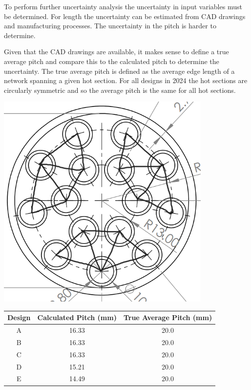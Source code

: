 \documentclass{article}
\begin{document}
To perform further uncertainty analysis the uncertainty in input variables must be determined.
For length the uncertainty can be estimated from CAD drawings and manufacturing processes.
The uncertainty in the pitch is harder to determine.

Given that the CAD drawings are available, it makes sense to define a true average pitch and compare this to the calculated pitch to determine the uncertainty.
The true average pitch is defined as the average edge length of a network spanning a given hot section.
For all designs in 2024 the hot sections are circularly symmetric and so the average pitch is the same for all hot sections.

\begin{minipage}[t]{0.29\textwidth}
    \centering
    \includegraphics[width=0.8\textwidth]{tube_network.png}
    \label{fig:tube_network}
\end{minipage}
\begin{minipage}[t]{0.69\textwidth}
    \centering
    \begin{tabular}{|c|c|c|}
        \hline
        Design & Calculated Pitch (mm) & True Average Pitch (mm) \\
        \hline
        A & 16.33 & 20.0 \\
        B & 16.33 & 20.0 \\
        C & 16.33 & 20.0 \\
        D & 15.21 & 20.0 \\
        E & 14.49 & 20.0 \\
        \hline
    \end{tabular}
    \label{tab:pitch_comparison}
\end{minipage}
\end{document}
